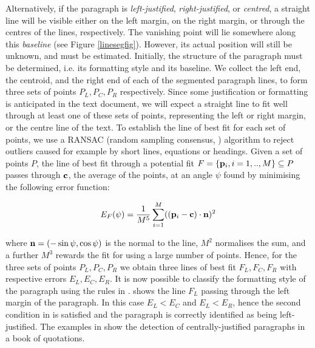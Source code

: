 Alternatively, if the paragraph is {\em left-justified}, {\em right-justified},
or {\em centred}, a straight line will be visible either on the left margin, on
the right margin, or through the centres of the lines, respectively.  The
vanishing point will lie somewhere along this {\em baseline} (see Figure \ref{linesegfig}).  However, its actual
position will still be unknown, and must be estimated.  Initially, 
the structure of the paragraph must be determined, i.e. its formatting style and its baseline. We collect
the left end, the centroid, and the right end of each of the segmented paragraph lines, to
form three sets of points $P_L,P_C,P_R$ respectively.  Since some justification
or formatting is anticipated in the text document, 
we will expect a straight line to
fit well through at least one of these sets of points, representing the left or
right margin, or the centre line of the text.  To establish the line of
best fit for each set of points, we use a RANSAC (random sampling consensus,
\cite{bolles81ransac-based}) algorithm to reject outliers caused for example by
short lines, equations or headings.  Given a set of points $P$, the line of best
fit through a potential fit $F=\{{ \bf p }_i, i=1,..,M\}\subseteq P$ passes
through ${ \bf c }$, the average of the points, at an angle $\psi$ found by
minimising the following error function:

\begin{equation}
E_F(\psi) = \frac{1}{M^5} \sum_{i=1}^{M} ( ({ \bf p }_i-{ \bf c }) \cdot { \bf n })^2
\label{ransacerroreqn}
\end{equation}

{\parindent 0mm
where ${ \bf n }=(-\sin \psi,\cos \psi)$ is the normal to the line, $M^{2}$
normalises the sum, and a further $M^{3}$ rewards the fit for using a large
number of points. Hence, for the three sets of points $P_L,P_C,P_R$ we obtain
three lines of best fit $F_L,F_C,F_R$ with respective errors
$E_L,E_C,E_R$.  It is now possible to classify the formatting style of the
paragraph using the rules in .
 shows the line $F_L$ passing through the left margin of
the paragraph.  In this case $E_L<E_C$ and $E_L<E_R$, hence the second
condition in  is satisfied and the paragraph is
correctly identified as being left-justified. The examples in 
 show the detection of centrally-justified paragraphs
in a book of quotations.
}


